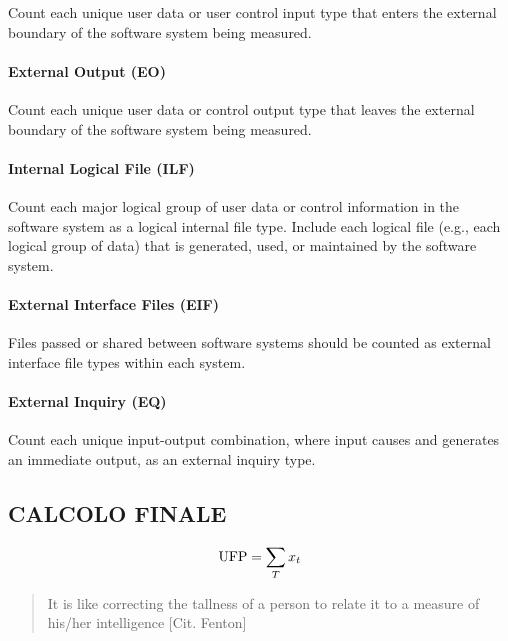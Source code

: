 Count each unique user data or user control input type that enters the external boundary of the software system being measured.


\paragraph{External Output (EO)}

Count each unique user data or control output type that leaves the external boundary of the software system being measured.


\paragraph{Internal Logical File (ILF)}

Count each major logical group of user data or control information in the software system as a logical internal file type. Include each logical file (e.g., each logical group of data) that is generated, used, or maintained by the software system.


\paragraph{External Interface Files (EIF)} 

Files passed or shared between software systems should be counted as external interface file types within each system.


\paragraph{External Inquiry (EQ)}
 
Count each unique input-output combination, where input causes and generates an immediate output, as an external inquiry type.



\subsection{CALCOLO FINALE}

\begin{equation}
\text{UFP} = \sum_{T} x_t
\end{equation}

\begin{quotation}
  It is like correcting the tallness of a person to relate it to a measure of his/her intelligence [Cit. Fenton]
\end{quotation}























